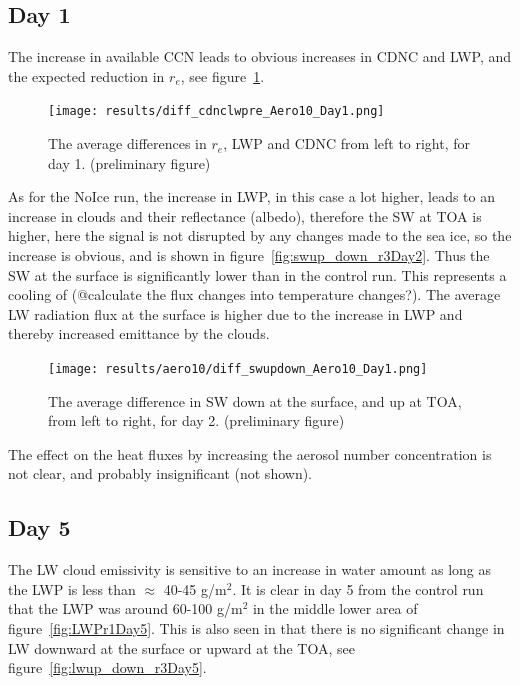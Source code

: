 \subsection{Day 1}
The increase in available CCN leads to obvious increases in CDNC and LWP, and the expected reduction in $r_e$, see figure~\ref{fig:cdnclwpre_Aero10}.%
\begin{figure}[h!]
\centering
\texttt{[image: results/diff\_cdnclwpre\_Aero10\_Day1.png]}
\caption{The average differences in $r_e$, LWP and CDNC from left to right, for day 1. (preliminary figure)}
\label{fig:cdnclwpre_Aero10}
\end{figure}

As for the NoIce run, the increase in LWP, in this case a lot higher, leads to an increase in clouds and their reflectance (albedo), therefore the SW at TOA is higher, here the signal is not disrupted by any changes made to the sea ice, so the increase is obvious, and is shown in figure~\ref{fig:swup_down_r3Day2}. Thus the SW at the surface is significantly lower than in the control run. This represents a cooling of (@calculate the flux changes into temperature changes?). The average LW radiation flux at the surface is higher due to the increase in LWP and thereby increased emittance by the clouds.%
\begin{figure}
\centering
\texttt{[image: results/aero10/diff\_swupdown\_Aero10\_Day1.png]}
\caption{The average difference in SW down at the surface, and up at TOA, from left to right, for day 2. (preliminary figure)}
\label{fig:swup_down_r3Day1}
\end{figure}
The effect on the heat fluxes by increasing the aerosol number concentration is not clear, and probably insignificant (not shown).

\subsection{Day 5}
The LW cloud emissivity is sensitive to an increase in water amount as long as the LWP is less than $\approx$ 40-45 g/m$^2$. It is clear in day 5 from the control run that the LWP was around 60-100 g/m$^2$ in the middle lower area of figure~\ref{fig:LWPr1Day5}.%
This is also seen in that there is no significant change in LW downward at the surface or upward at the TOA, see figure~\ref{fig:lwup_down_r3Day5}.

